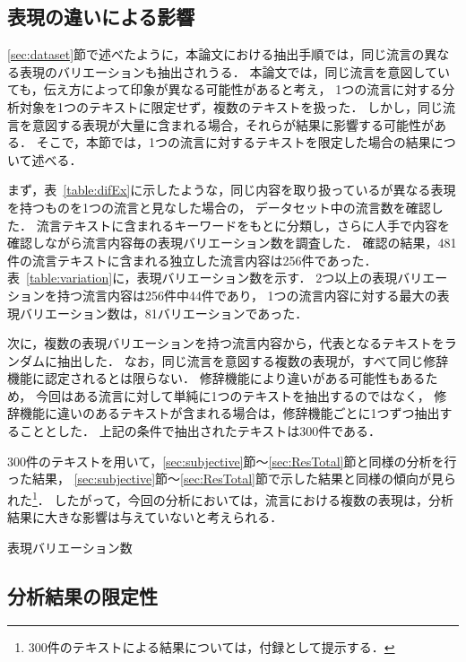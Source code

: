 \documentclass[japanese]{jnlp_1.4}
\begin{document}
\subsection{表現の違いによる影響}
\label{sec:diff}

\ref{sec:dataset}節で述べたように，本論文における抽出手順では，同じ流言の異なる表現のバリエーションも抽出されうる．
本論文では，同じ流言を意図していても，伝え方によって印象が異なる可能性があると考え，
1つの流言に対する分析対象を1つのテキストに限定せず，複数のテキストを扱った．
しかし，同じ流言を意図する表現が大量に含まれる場合，それらが結果に影響する可能性がある．
そこで，本節では，1つの流言に対するテキストを限定した場合の結果について述べる．

まず，表~\ref{table:difEx}に示したような，同じ内容を取り扱っているが異なる表現を持つものを1つの流言と見なした場合の，
データセット中の流言数を確認した．
流言テキストに含まれるキーワードをもとに分類し，さらに人手で内容を確認しながら流言内容毎の表現バリエーション数を調査した．
確認の結果，481件の流言テキストに含まれる独立した流言内容は256件であった．
表~\ref{table:variation}に，表現バリエーション数を示す．
2つ以上の表現バリエーションを持つ流言内容は256件中44件であり，
1つの流言内容に対する最大の表現バリエーション数は，81バリエーションであった．

次に，複数の表現バリエーションを持つ流言内容から，代表となるテキストをランダムに抽出した．
なお，同じ流言を意図する複数の表現が，すべて同じ修辞機能に認定されるとは限らない．
修辞機能により違いがある可能性もあるため，
今回はある流言に対して単純に1つのテキストを抽出するのではなく，
修辞機能に違いのあるテキストが含まれる場合は，修辞機能ごとに1つずつ抽出することとした．
上記の条件で抽出されたテキストは300件である．

300件のテキストを用いて，\ref{sec:subjective}節〜\ref{sec:ResTotal}節と同様の分析を行った結果，
\ref{sec:subjective}節〜\ref{sec:ResTotal}節で示した結果と同様の傾向が見られた\footnote{300件のテキストによる結果については，付録として提示する．}．
したがって，今回の分析においては，流言における複数の表現は，分析結果に大きな影響は与えていないと考えられる．

\begin{table}[t]
\caption{表現バリエーション数}
\label{table:variation}

\end{table}


\subsection{分析結果の限定性}
\end{document}
